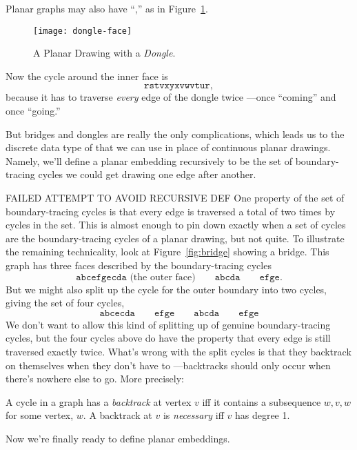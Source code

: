 Planar graphs may also have ``,'' as in
Figure~\ref{fig:dongle}.
\begin{figure}[h]
\centering \texttt{[image: dongle-face]}
\caption{A Planar Drawing with a \emph{Dongle}.}
\label{fig:dongle}
\end{figure}
Now the cycle around the inner face is
\[
\mathtt{rstvxyxvwvtur},
\]
because it has to traverse \emph{every} edge of the dongle twice ---once
``coming'' and once ``going.''

But bridges and dongles are really the only complications, which leads
us to the discrete data type of  that we can use
in place of continuous planar drawings.  Namely, we'll define a planar
embedding recursively to be the set of boundary-tracing cycles we could
get drawing one edge after another.

\iffalse  FAILED ATTEMPT TO AVOID RECURSIVE DEF
One property of the set of boundary-tracing cycles is that every
edge is traversed a total of two times by cycles in the set.  This is
almost enough to pin down exactly when a set of cycles are the
boundary-tracing cycles of a planar drawing, but not quite.  To illustrate
the remaining technicality, look at Figure~\ref{fig:bridge} showing a
bridge.  This graph has three faces described by the boundary-tracing
cycles
\[
\mathtt{abcefgecda} \text{ (the outer face)} \qquad \mathtt{abcda}\qquad
\mathtt{efge}.
\]
But we might also split up the cycle for the outer boundary into two
cycles, giving the set of four cycles,
\[
\mathtt{abcecda}\qquad \mathtt{efge} \qquad \mathtt{abcda}\qquad
\mathtt{efge}
\]
We don't want to allow this kind of splitting up of genuine
boundary-tracing cycles, but the four cycles above do have the property
that every edge is still traversed exactly twice.  What's wrong with the
split cycles is that they backtrack on themselves when they don't have to
---backtracks should only occur when there's nowhere else to go.  More
precisely:
\begin{definition}
A cycle in a graph has a \emph{backtrack} at vertex $v$ iff it contains a
subsequence $w,v,w$ for some vertex, $w$.  A backtrack at $v$ is
\emph{necessary} iff $v$ has degree 1.
\end{definition}
Now we're finally ready to define planar embeddings.

